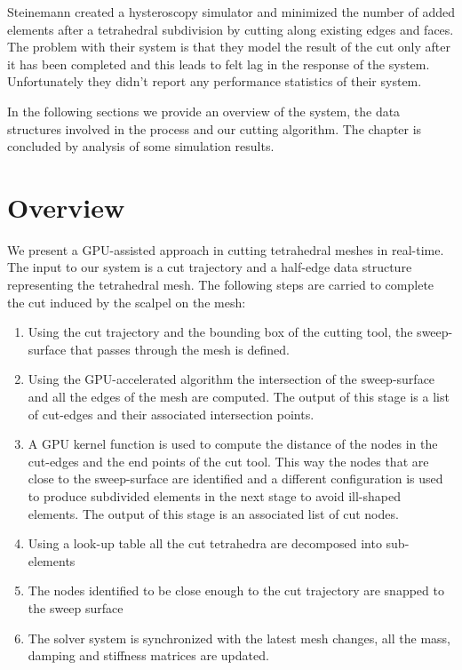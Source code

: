 Steinemann \etal \cite{Steinemann} created a hysteroscopy simulator and minimized the number of added elements 
after a tetrahedral subdivision by cutting along existing edges and faces. The problem with their system is that
they model the result of the cut only after it has been completed and this leads to felt lag in the response
of the system. Unfortunately they didn't report any performance statistics of their system. 

In the following sections we provide an overview of the system, the data structures involved in the process 
and our cutting algorithm. The chapter is concluded by analysis of some simulation results.

\section{Overview}
We present a GPU-assisted approach in cutting tetrahedral meshes in real-time. 
The input to our system is a cut trajectory and a half-edge data structure representing the tetrahedral mesh. 
The following steps are carried to complete the cut induced by the scalpel on the mesh:

\begin{enumerate}
 \item Using the cut trajectory and the bounding box of the cutting tool, the sweep-surface that passes through 
 the mesh is defined.
 \item Using the GPU-accelerated algorithm the intersection of the sweep-surface and all the edges of the mesh 
 are computed. The output of this stage is a list of cut-edges and their associated intersection points. 
 
 \item A GPU kernel function is used to compute the distance of the nodes in the cut-edges and the end points of 
 the cut tool. This way the nodes that are close to the sweep-surface are identified and a different configuration 
 is used to produce subdivided elements in the next stage to avoid ill-shaped elements. The output of this stage is an
 associated list of cut nodes.
 
 \item Using a look-up table all the cut tetrahedra are decomposed into sub-elements
 
 \item The nodes identified to be close enough to the cut trajectory are snapped to the sweep surface
 
 \item The solver system is synchronized with the latest mesh changes, all the mass, damping and stiffness 
 matrices are updated.
\end{enumerate}



